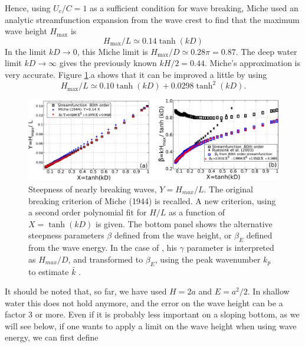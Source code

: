 Hence, using $U_c/C = 1$ as a sufficient condition for wave breaking, 
Miche used an analytic streamfunction expansion from the wave crest to find that the maximum wave height $H_{\max}$ is 
\begin{equation}
 H_{\max}/L \simeq 0.14 \tanh(kD)
\end{equation}
In the limit $kD \rightarrow 0$, this Miche limit is $H_{\max}/D\simeq 0.28 \pi = 0.87$. The deep water limit $kD \rightarrow \infty$ gives the 
previously known $kH/2 = 0.44$.  Miche's approximation is very accurate.  Figure \ref{fig:STREAM}.a shows that it can be improved a little by using  
\begin{equation}
 H_{\max}/L \simeq 0.10 \tanh(kD)+ 0.0298 \tanh^2(kD).
\end{equation}
\begin{figure}[htb]
 \vspace{9pt}
\centerline{\includegraphics[width=\linewidth]{FIGS_CH_SURF/wave_stream_Hmax.pdf}}
 \caption{Steepness of nearly breaking waves, $Y=H_{max}/L$. The original breaking criterion of Miche (1944) is recalled. 
 A new
 criterion, using a second order polynomial fit for $H/L$ as a function of $X=\tanh(kD)$ is given. 
 The bottom panel shows the alternative
 steepness parameters $\beta$ defined from the wave height, or $\beta_E$ defined from the wave energy. In the case of \cite{Ruessink&al.2003}, his $\gamma$ parameter 
 is interpreted as $H_{max}/D$, and transformed to $\beta_{E}$, using the peak wavenumber $k_p$ to estimate $\bar{k}$ 
 \citep[adapted from ][]{Filipot&al.2010}.}
 \label{fig:STREAM}
\end{figure}
It should be noted that, so far, we have used $H=2a$ and $E=a^2/2$. In shallow water this does not hold anymore, and the error on the wave 
height can be a factor 3 or more. Even if it is probably less important on a sloping bottom, as we will see below, if one wants to apply a limit on the wave 
height when using wave energy, we can first define
